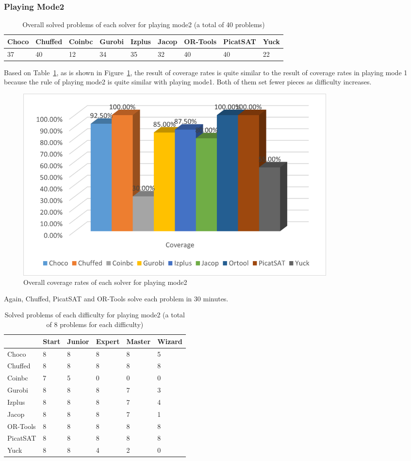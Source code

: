 \subsubsection{Playing Mode2}
\begin{table}[H]
\centering
\caption{Overall solved problems of each solver for playing mode2 (a total of 40 problems)}
\label{tab:solvedproblem2}
\begin{tabular}{|l|l|l|l|l|l|l|l|l|}
\hline
Choco & Chuffed & Coinbc& Gurobi & Izplus&Jacop& OR-Tools& PicatSAT&Yuck \\
\hline
37   &40      & 12    & 34    &35     &32   &40    &40      &22\\
\hline
\end{tabular}
\end{table}
Based on Table~\ref{tab:solvedproblem2}, as is shown in Figure~\ref{fig:mode2eva2}, the result of coverage rates is quite similar to the result of coverage rates in playing mode 1 because the rule of playing mode2 is quite similar with playing mode1. Both of them set fewer pieces as difficulty increases.
\begin{figure}[H]
     \centering
    \includegraphics[width=0.8\textwidth]{figs/mode2coverage.png}
    \caption{Overall coverage rates of each solver for playing mode2}
    \label{fig:mode2eva2}
\end{figure}
Again, Chuffed, PicatSAT and OR-Tools solve each problem in 30 minutes. 
\begin{table}[H]
\centering
\caption{Solved problems of each difficulty for playing mode2 (a total of 8 problems for each difficulty)}
\label{tab:solvedproblemforeach difficulty2}
\begin{tabular}{|l|l|l|l|l|l|}
\hline
	    &Start	&Junior	&Expert	&Master	&Wizard\\
\hline
Choco	&8	&8	&8	&8	&5\\
\hline
Chuffed	&8	&8	&8	&8	&8\\
\hline
Coinbc	&7	&5	&0	&0	&0\\
\hline
Gurobi	&8	&8	&8	&7	&3\\
\hline
Izplus	&8	&8	&8	&7	&4\\
\hline
Jacop	&8	&8	&8	&7	&1\\
\hline
OR-Tools	&8	&8	&8	&8	&8\\
\hline
PicatSAT	&8	&8	&8	&8	&8\\
\hline
Yuck	&8	&8	&4	&2	&0\\
\hline
\end{tabular}
\end{table}

